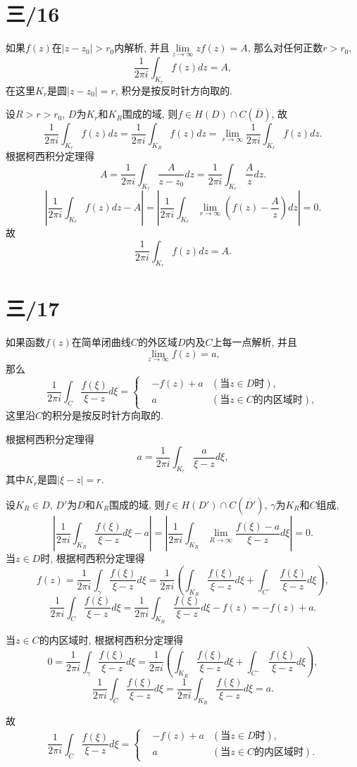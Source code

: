 \documentclass[11pt,a4paper]{article}
\begin{document}
\section{三/16}
\begin{problem}
如果$f(z)$在$|z-z_0|>r_0$内解析, 并且$\lim\limits_{z\to\infty}zf(z)=A$, 那么对任何正数$r>r_0,$
$$\frac{1}{2\pi i}\int_{K_r}f(z)dz=A,$$
在这里$K_r$是圆$|z-z_0|=r$, 积分是按反时针方向取的.
\end{problem}

设$R>r>r_0$, $D$为$K_r$和$K_R$围成的域, 则$f\in H(D)\cap C(\overline{D})$, 故
$$\frac{1}{2\pi i}\int_{K_r}f(z)dz=\frac{1}{2\pi i}\int_{K_R}f(z)dz=\lim_{r\to\infty}\frac{1}{2\pi i}\int_{K_r}f(z)dz.$$
根据柯西积分定理得
$$A=\frac{1}{2\pi i}\int_{K_r}\frac{A}{z-z_0}dz=\frac{1}{2\pi i}\int_{K_r}\frac{A}{z}dz.$$
$$\left|\frac{1}{2\pi i}\int_{K_r}f(z)dz-A\right|=\left|\frac{1}{2\pi i}\int_{K_r}\lim_{r\to\infty}\left(f(z)-\frac{A}{z}\right)dz\right|=0.$$
故$$\frac{1}{2\pi i}\int_{K_r}f(z)dz=A.$$

\section{三/17}
\begin{problem}
如果函数$f(z)$在简单闭曲线$C$的外区域$D$内及$C$上每一点解析, 并且
$$\lim_{z\to\infty}f(z)=a,$$
那么
$$\frac{1}{2\pi i}\int_C\frac{f(\xi)}{\xi-z}d\xi=\left\{\begin{aligned}
     & -f(z)+a & (\text{当}z\in D\text{时}),         \\
     & a       & (\text{当}z\in C\text{的内区域时}),
  \end{aligned}\right.$$
这里沿$C$的积分是按反时针方向取的.
\end{problem}

根据柯西积分定理得
$$a=\frac{1}{2\pi i}\int_{K_r}\frac{a}{\xi-z}d\xi,$$
其中$K_r$是圆$|\xi-z|=r$. \medskip

设$K_R\in D$, $D'$为$D$和$K_R$围成的域, 则$f\in H(D')\cap C(\overline{D'})$, $\gamma$为$K_R$和$C$组成,
$$\left|\frac{1}{2\pi i}\int_{K_R}\frac{f(\xi)}{\xi-z}d\xi-a\right|=\left|\frac{1}{2\pi i}\int_{K_R}\lim_{R\to\infty}\frac{f(\xi)-a}{\xi-z}d\xi\right|=0.$$
当$z\in D$时, 根据柯西积分定理得
$$f(z)=\frac{1}{2\pi i}\int_\gamma\frac{f(\xi)}{\xi-z}d\xi=\frac{1}{2\pi i}\left(\int_{K_R}\frac{f(\xi)}{\xi-z}d\xi+\int_{C^-}\frac{f(\xi)}{\xi-z}d\xi\right),$$
$$\frac{1}{2\pi i}\int_{C}\frac{f(\xi)}{\xi-z}d\xi=\frac{1}{2\pi i}\int_{K_R}\frac{f(\xi)}{\xi-z}d\xi-f(z)=-f(z)+a.$$

当$z\in C$的内区域时, 根据柯西积分定理得
$$0=\frac{1}{2\pi i}\int_\gamma\frac{f(\xi)}{\xi-z}d\xi=\frac{1}{2\pi i}\left(\int_{K_R}\frac{f(\xi)}{\xi-z}d\xi+\int_{C^-}\frac{f(\xi)}{\xi-z}d\xi\right),$$
$$\frac{1}{2\pi i}\int_{C}\frac{f(\xi)}{\xi-z}d\xi=\frac{1}{2\pi i}\int_{K_R}\frac{f(\xi)}{\xi-z}d\xi=a.$$

故$$\frac{1}{2\pi i}\int_C\frac{f(\xi)}{\xi-z}d\xi=\left\{\begin{aligned}
     & -f(z)+a & (\text{当}z\in D\text{时}),         \\
     & a       & (\text{当}z\in C\text{的内区域时}).
  \end{aligned}\right.$$
\end{document}
